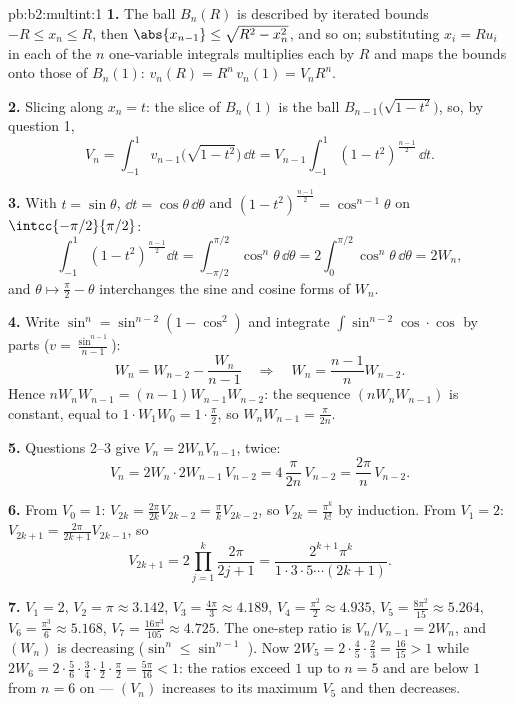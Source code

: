 \begin{solution}{pb:b2:multint:1}
\textbf{1.} The ball $B_n(R)$ is described by iterated bounds
$-R \leq x_n \leq R$, then $\abs{x_{n-1}} \leq \sqrt{R^2 -
x_n^2}$, and so on; substituting $x_i = Ru_i$ in each of the
$n$ one-variable integrals multiplies each by $R$ and maps
the bounds onto those of $B_n(1)$: $v_n(R) = R^n\,v_n(1) =
V_nR^n$.

\textbf{2.} Slicing along $x_n = t$: the slice of $B_n(1)$ is
the ball $B_{n-1}\bigl(\sqrt{1 - t^2}\bigr)$, so, by question
1,
\[
V_n = \int_{-1}^1 v_{n-1}\bigl(\sqrt{1 - t^2}\bigr)\,\dd t
= V_{n-1}\int_{-1}^{1}(1 - t^2)^{\frac{n-1}2}\,\dd t .
\]

\textbf{3.} With $t = \sin\theta$, $\dd t =
\cos\theta\,\dd\theta$ and $(1 - t^2)^{\frac{n-1}2} =
\cos^{n-1}\theta$ on $\intcc{-\pi/2}{\pi/2}$:
\[
\int_{-1}^1(1 - t^2)^{\frac{n-1}2}\dd t
= \int_{-\pi/2}^{\pi/2}\cos^n\theta\,\dd\theta
= 2\int_0^{\pi/2}\cos^n\theta\,\dd\theta = 2W_n,
\]
and $\theta \mapsto \frac\pi2 - \theta$ interchanges the sine
and cosine forms of $W_n$.

\textbf{4.} Write $\sin^n = \sin^{n-2}(1 - \cos^2)$ and
integrate $\int\sin^{n-2}\cos\cdot\cos$ by parts ($v =
\frac{\sin^{n-1}}{n-1}$):
\[
W_n = W_{n-2} - \frac{W_n}{n-1}
\quad\Longrightarrow\quad
W_n = \frac{n-1}{n}W_{n-2}.
\]
Hence $nW_nW_{n-1} = (n-1)W_{n-1}W_{n-2}$: the sequence
$(nW_nW_{n-1})$ is constant, equal to $1\cdot W_1W_0 =
1\cdot\frac\pi2$, so $W_nW_{n-1} = \frac{\pi}{2n}$.

\textbf{5.} Questions 2--3 give $V_n = 2W_nV_{n-1}$, twice:
\[
V_n = 2W_n\cdot 2W_{n-1}\,V_{n-2}
= 4\,\frac{\pi}{2n}\,V_{n-2} = \frac{2\pi}n\,V_{n-2}.
\]

\textbf{6.} From $V_0 = 1$: $V_{2k} = \frac{2\pi}{2k}V_{2k-2}
= \frac\pi kV_{2k-2}$, so $V_{2k} = \frac{\pi^k}{k!}$ by
induction. From $V_1 = 2$: $V_{2k+1} =
\frac{2\pi}{2k+1}V_{2k-1}$, so
\[
V_{2k+1} = 2\prod_{j=1}^k\frac{2\pi}{2j+1}
= \frac{2^{k+1}\pi^k}{1\cdot3\cdot5\cdots(2k+1)} .
\]

\textbf{7.} $V_1 = 2$, $V_2 = \pi \approx 3.142$, $V_3 =
\frac{4\pi}3 \approx 4.189$, $V_4 = \frac{\pi^2}2 \approx
4.935$, $V_5 = \frac{8\pi^2}{15} \approx 5.264$, $V_6 =
\frac{\pi^3}6 \approx 5.168$, $V_7 = \frac{16\pi^3}{105}
\approx 4.725$. The one-step ratio is $V_n/V_{n-1} = 2W_n$,
and $(W_n)$ is decreasing ($\sin^n \leq \sin^{n-1}$
). Now $2W_5 = 2\cdot\frac45\cdot\frac23 =
\frac{16}{15} > 1$ while $2W_6 =
2\cdot\frac56\cdot\frac34\cdot\frac12\cdot\frac\pi2 =
\frac{5\pi}{16} < 1$: the ratios exceed $1$ up to $n = 5$ and
are below $1$ from $n = 6$ on --- $(V_n)$ increases to its
maximum $V_5$ and then decreases.


\end{solution}
